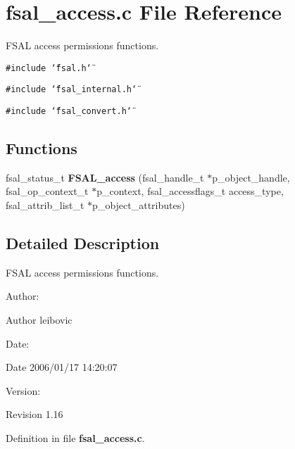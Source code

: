 \section{fsal\_\-access.c File Reference}
\label{fsal__access_8c}
FSAL access permissions functions. 

{\tt \#include \char`\"{}fsal.h\char`\"{}}\par
{\tt \#include \char`\"{}fsal\_\-internal.h\char`\"{}}\par
{\tt \#include \char`\"{}fsal\_\-convert.h\char`\"{}}\par
\subsection*{Functions}
\begin{CompactItemize}
\item 
fsal\_\-status\_\-t {\bf FSAL\_\-access} (fsal\_\-handle\_\-t $\ast$p\_\-object\_\-handle, fsal\_\-op\_\-context\_\-t $\ast$p\_\-context, fsal\_\-accessflags\_\-t access\_\-type, fsal\_\-attrib\_\-list\_\-t $\ast$p\_\-object\_\-attributes)
\end{CompactItemize}


\subsection{Detailed Description}
FSAL access permissions functions. 

\begin{Desc}
\item[Author:]\begin{Desc}
\item[Author]leibovic \end{Desc}
\end{Desc}
\begin{Desc}
\item[Date:]\begin{Desc}
\item[Date]2006/01/17 14:20:07 \end{Desc}
\end{Desc}
\begin{Desc}
\item[Version:]\begin{Desc}
\item[Revision]1.16 \end{Desc}
\end{Desc}


Definition in file {\bf fsal\_\-access.c}.

